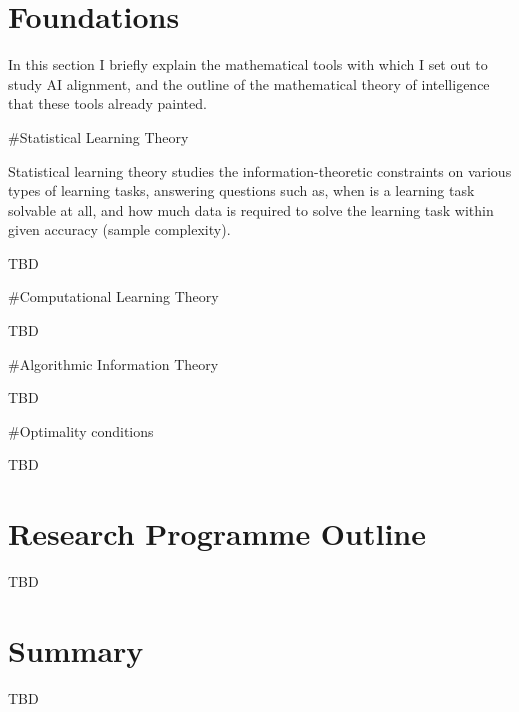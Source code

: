 \documentclass[a4paper]{article}
\begin{document}
\section{Foundations}

In this section I briefly explain the mathematical tools with which I set out to study AI alignment, and the outline of the mathematical theory of intelligence that these tools already painted.

\#Statistical Learning Theory

Statistical learning theory studies the information-theoretic constraints on various types of learning tasks, answering questions such as, when is a learning task solvable at all, and how much data is required to solve the learning task within given accuracy (sample complexity).

TBD

\#Computational Learning Theory

TBD

\#Algorithmic Information Theory

TBD

\#Optimality conditions

TBD

\section{Research Programme Outline}


TBD

\section{Summary}


TBD
\end{document}
